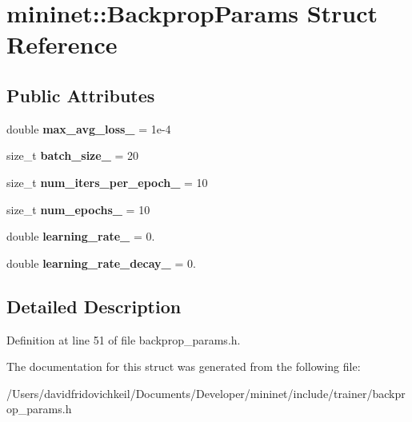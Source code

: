 \hypertarget{structmininet_1_1_backprop_params}{}\section{mininet\+:\+:Backprop\+Params Struct Reference}
\label{structmininet_1_1_backprop_params}
\subsection*{Public Attributes}
\begin{DoxyCompactItemize}
\item 
\hypertarget{structmininet_1_1_backprop_params_af4eee86c87c22531f2341de24ba90c86}{}\label{structmininet_1_1_backprop_params_af4eee86c87c22531f2341de24ba90c86} 
double {\bfseries max\+\_\+avg\+\_\+loss\+\_\+} = 1e-\/4
\item 
\hypertarget{structmininet_1_1_backprop_params_a89f75ef7b703abf69fde84f2df4e8648}{}\label{structmininet_1_1_backprop_params_a89f75ef7b703abf69fde84f2df4e8648} 
size\+\_\+t {\bfseries batch\+\_\+size\+\_\+} = 20
\item 
\hypertarget{structmininet_1_1_backprop_params_aa714c38be8deba2586ebb486a6f759dd}{}\label{structmininet_1_1_backprop_params_aa714c38be8deba2586ebb486a6f759dd} 
size\+\_\+t {\bfseries num\+\_\+iters\+\_\+per\+\_\+epoch\+\_\+} = 10
\item 
\hypertarget{structmininet_1_1_backprop_params_adf7d38efd1f9d8b12f69300c94b11bd6}{}\label{structmininet_1_1_backprop_params_adf7d38efd1f9d8b12f69300c94b11bd6} 
size\+\_\+t {\bfseries num\+\_\+epochs\+\_\+} = 10
\item 
\hypertarget{structmininet_1_1_backprop_params_ae7774867f9587f2f07a6fc8dc073585d}{}\label{structmininet_1_1_backprop_params_ae7774867f9587f2f07a6fc8dc073585d} 
double {\bfseries learning\+\_\+rate\+\_\+} = 0.
\item 
\hypertarget{structmininet_1_1_backprop_params_abf7115d0cc8e9ae54d1aec6b2fc4ae21}{}\label{structmininet_1_1_backprop_params_abf7115d0cc8e9ae54d1aec6b2fc4ae21} 
double {\bfseries learning\+\_\+rate\+\_\+decay\+\_\+} = 0.
\end{DoxyCompactItemize}


\subsection{Detailed Description}


Definition at line 51 of file backprop\+\_\+params.\+h.



The documentation for this struct was generated from the following file\+:\begin{DoxyCompactItemize}
\item 
/\+Users/davidfridovichkeil/\+Documents/\+Developer/mininet/include/trainer/backprop\+\_\+params.\+h\end{DoxyCompactItemize}
